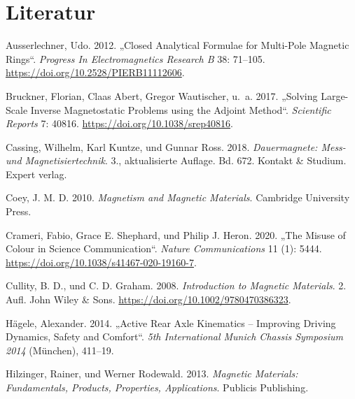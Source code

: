 \documentclass[
  ngerman,
  a4paper,
  twoside]{scrbook}
\makeatletter
\newlength{\cslhangindent}
\newenvironment{CSLReferences}[2] %
 {\begin{list}{}{%
  \setlength{\itemindent}{0pt}
  \setlength{\leftmargin}{0pt}
  \setlength{\parsep}{0pt}
  \ifodd #1
   \setlength{\leftmargin}{\cslhangindent}
   \setlength{\itemindent}{-1\cslhangindent}
  \fi
  \setlength{\itemsep}{#2\baselineskip}}}
 {\end{list}}
\newcommand{\innomag@addcontentsline}[3]{%
  \ifstrequal{#1}{toc}{%
    \ifstrequal{#2}{chapter}{%
      \IfBeginWith{\@currentHref}{chapter.}{}{%
        \phantomsection
      }%
    }{}%
  }{}%
  \innomag@originaladdcontentsline{#1}{#2}{#3}%
}
\let\innomag@originaladdcontentsline\addcontentsline
\let\addcontentsline\innomag@addcontentsline
\makeatother
\begin{document}

\chapter*{Literatur}\label{literatur}


\protect{}\label{refs}
\begin{CSLReferences}{1}{1}
Ausserlechner, Udo. 2012. {„Closed Analytical Formulae for Multi-Pole
Magnetic Rings``}. \emph{Progress In Electromagnetics Research B} 38:
71--105. \url{https://doi.org/10.2528/PIERB11112606}.

Bruckner, Florian, Claas Abert, Gregor Wautischer, u.~a. 2017. {„Solving
Large-Scale Inverse Magnetostatic Problems using the Adjoint Method``}.
\emph{Scientific Reports} 7: 40816.
\url{https://doi.org/10.1038/srep40816}.

Cassing, Wilhelm, Karl Kuntze, und Gunnar Ross. 2018.
\emph{Dauermagnete: Mess- und Magnetisiertechnik}. 3., aktualisierte
Auflage. Bd. 672. Kontakt \& Studium. Expert verlag.

Coey, J. M. D. 2010. \emph{Magnetism and Magnetic Materials}. Cambridge
University Press.

Crameri, Fabio, Grace E. Shephard, und Philip J. Heron. 2020. {„The
Misuse of Colour in Science Communication``}. \emph{Nature
Communications} 11 (1): 5444.
\url{https://doi.org/10.1038/s41467-020-19160-7}.

Cullity, B. D., und C. D. Graham. 2008. \emph{Introduction to Magnetic
Materials}. 2. Aufl. John Wiley \& Sons.
\url{https://doi.org/10.1002/9780470386323}.

Hägele, Alexander. 2014. {„Active Rear Axle Kinematics -- Improving
Driving Dynamics, Safety and Comfort``}. \emph{5th International Munich
Chassis Symposium 2014} (München), 411--19.

Hilzinger, Rainer, und Werner Rodewald. 2013. \emph{Magnetic Materials:
Fundamentals, Products, Properties, Applications}. Publicis Publishing.


\end{CSLReferences}
\end{document}
